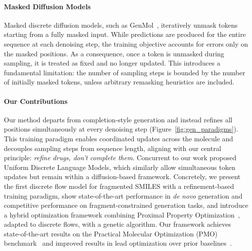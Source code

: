 \documentclass{article} %
\begin{document}
\paragraph{Masked Diffusion Models}
Masked discrete diffusion models, such as GenMol~\citep{genmol}, iteratively unmask tokens starting from a fully masked input.  While predictions are produced for the entire sequence at each denoising step, the training objective accounts for errors only on the masked positions. As a consequence, once a token is unmasked during sampling, it is treated as fixed and no longer updated. This introduces a fundamental limitation: the number of sampling steps is bounded by the number of initially masked tokens, unless arbitrary remasking heuristics are included.
\paragraph{Our Contributions}Our method departs from completion-style generation and instead refines all positions simultaneously at every denoising step (Figure~\ref{fig:gen_paradigms}). This training paradigm enables coordinated updates across the molecule and decouples sampling steps from sequence length, aligning with our central principle: \emph{refine drugs, don’t complete them}. Concurrent to our work \citep{schiff2025simpleguidancemechanismsdiscrete} proposed Uniform Discrete Language Models, which similarly allow simultaneous token updates but remain within a diffusion-based framework. Concretely, we present the first discrete flow model for fragmented SMILES with a refinement-based training paradigm, show state-of-the-art performance in \textit{de novo} generation and competitive performance on fragment-constrained generation tasks, and introduce a hybrid optimization framework combining Proximal Property Optimization~\citep{schulman2017proximal}, adapted to discrete flows, with a genetic algorithm. Our framework achieves state-of-the-art results on the Practical Molecular Optimization (PMO) benchmark~\citep{gao2022sampleefficiencymattersbenchmark} and improved results in lead optimization over prior baselines~\citep{genmol}.
\end{document}
